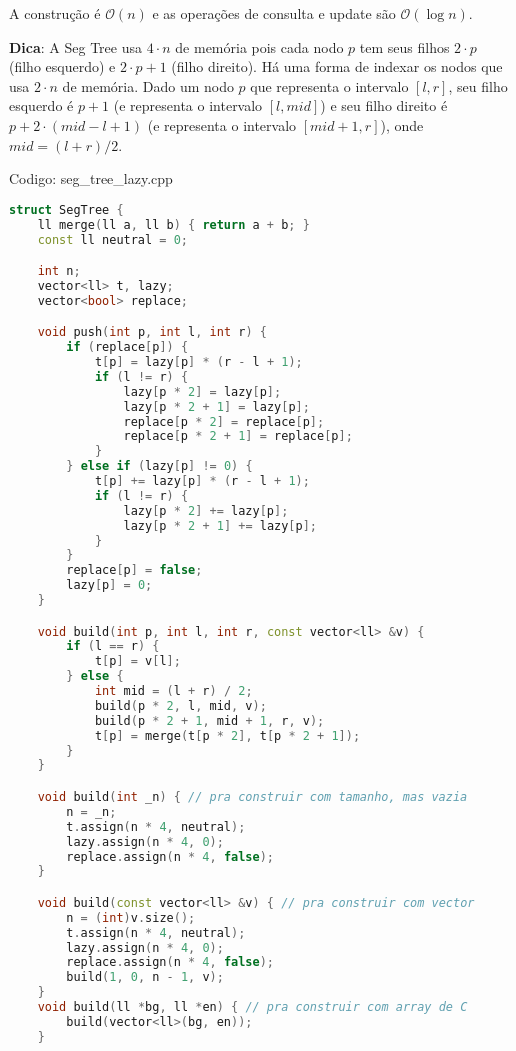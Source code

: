 \documentclass[10pt, a4paper, oneside]{book}
\begin{document}
A construção é $\mathcal{O}(n)$ e as operações de consulta e update são $\mathcal{O}(\log n)$.



\textbf{Dica}: A Seg Tree usa $4 \cdot n$ de memória pois cada nodo $p$ tem seus filhos $2 \cdot p$ (filho esquerdo) e $2 \cdot p + 1$ (filho direito). Há uma forma de indexar os nodos que usa $2 \cdot n$ de memória. Dado um nodo $p$ que representa o intervalo $[l, r]$, seu filho esquerdo é $p+1$ (e representa o intervalo $[l, mid]$) e seu filho direito é $p+2 \cdot (mid-l+1)$ (e representa o intervalo $[mid+1, r]$), onde $mid = (l+r)/2$.
\hfill

Codigo: seg\_tree\_lazy.cpp

\begin{lstlisting}[language=C++]
struct SegTree {
    ll merge(ll a, ll b) { return a + b; }
    const ll neutral = 0;

    int n;
    vector<ll> t, lazy;
    vector<bool> replace;

    void push(int p, int l, int r) {
        if (replace[p]) {
            t[p] = lazy[p] * (r - l + 1);
            if (l != r) {
                lazy[p * 2] = lazy[p];
                lazy[p * 2 + 1] = lazy[p];
                replace[p * 2] = replace[p];
                replace[p * 2 + 1] = replace[p];
            }
        } else if (lazy[p] != 0) {
            t[p] += lazy[p] * (r - l + 1);
            if (l != r) {
                lazy[p * 2] += lazy[p];
                lazy[p * 2 + 1] += lazy[p];
            }
        }
        replace[p] = false;
        lazy[p] = 0;
    }

    void build(int p, int l, int r, const vector<ll> &v) {
        if (l == r) {
            t[p] = v[l];
        } else {
            int mid = (l + r) / 2;
            build(p * 2, l, mid, v);
            build(p * 2 + 1, mid + 1, r, v);
            t[p] = merge(t[p * 2], t[p * 2 + 1]);
        }
    }

    void build(int _n) { // pra construir com tamanho, mas vazia
        n = _n;
        t.assign(n * 4, neutral);
        lazy.assign(n * 4, 0);
        replace.assign(n * 4, false);
    }

    void build(const vector<ll> &v) { // pra construir com vector
        n = (int)v.size();
        t.assign(n * 4, neutral);
        lazy.assign(n * 4, 0);
        replace.assign(n * 4, false);
        build(1, 0, n - 1, v);
    }
    void build(ll *bg, ll *en) { // pra construir com array de C
        build(vector<ll>(bg, en));
    }


\end{lstlisting}
\end{document}
